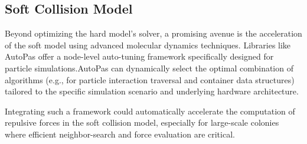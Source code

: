 \documentclass[conference]{IEEEtran}
\begin{document}
\cite{Tasora2008}

\subsection{Soft Collision Model}

Beyond optimizing the hard model's solver, a promising avenue is the acceleration of the soft model using advanced molecular dynamics techniques. Libraries like AutoPas\cite{AutoPasGithub,Gratl2019,Newcome2023} offer a node-level auto-tuning framework specifically designed for particle simulations.AutoPas can dynamically select the optimal combination of algorithms (e.g., for particle interaction traversal and container data structures) tailored to the specific simulation scenario and underlying hardware architecture.

Integrating such a framework could automatically accelerate the computation of repulsive forces in the soft collision model, especially for large-scale colonies where efficient neighbor-search and force evaluation are critical.

\newpage

\balance



\newpage
\tableofcontents
\end{document}
